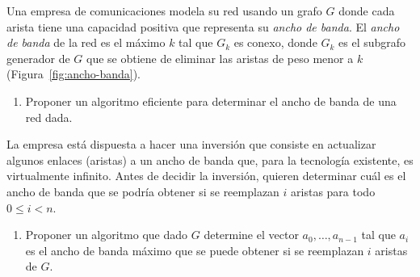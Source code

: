 
  
  \item\Obligatorio Una empresa de comunicaciones modela su red usando un grafo $G$ donde cada arista tiene una capacidad positiva que representa su \emph{ancho de banda}.  El \emph{ancho de banda} de la red es el máximo $k$ tal que $G_k$ es conexo, donde $G_k$ es el subgrafo generador de $G$ que se obtiene de eliminar las aristas de peso menor a $k$ (Figura~\ref{fig:ancho-banda}).
  
 \begin{enumerate}[label=$\alph*)$,ref=$\alph*)$]
  \item Proponer un algoritmo eficiente para determinar el ancho de banda de una red dada.
 \end{enumerate}
 
 La empresa está dispuesta a hacer una inversión que consiste en actualizar algunos enlaces (aristas) a un ancho de banda que, para la tecnología existente, es virtualmente infinito.  Antes de decidir la inversión, quieren determinar cuál es el ancho de banda que se podría obtener si se reemplazan $i$ aristas para todo $0 \leq i < n$.
 
 \begin{enumerate}[resume]
  \item Proponer un algoritmo que dado $G$ determine el vector $a_0, \ldots, a_{n-1}$ tal que $a_i$ es el ancho de banda máximo que se puede obtener si se reemplazan $i$ aristas de $G$.
 \end{enumerate}


